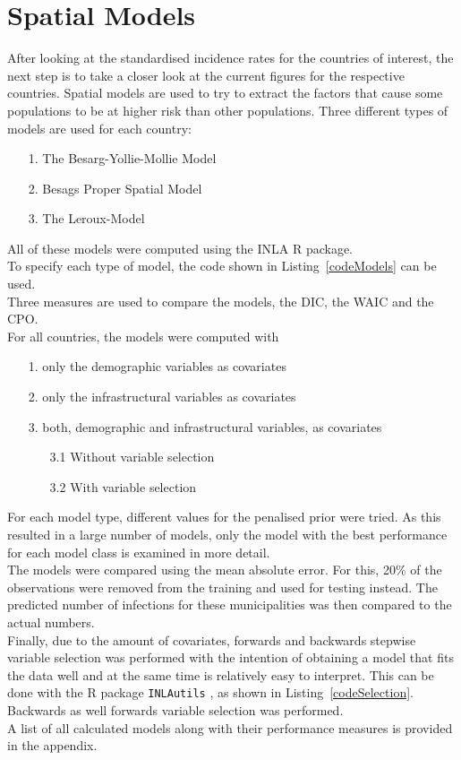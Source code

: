 \section{Spatial Models}
After looking at the standardised incidence rates for the countries of interest, the next step is to take a closer look at the current figures for the respective countries. Spatial models are used to try to extract the factors that cause some populations to be at higher risk than other populations. Three different types of models are used for each country:
\begin{itemize}
    \item[1.] The Besarg-Yollie-Mollie Model
    \item[2.] Besags Proper Spatial Model
    \item[3.] The Leroux-Model
\end{itemize}
All of these models were computed using the INLA \cite{rinla} R package. \\
To specify each type of model, the code shown in Listing~\ref{codeModels} can be used. \\
Three measures are used to compare the models, the DIC, the WAIC and the CPO. \\
For all countries, the models were computed with
\begin{itemize}
    \item[1.] only the demographic variables as covariates
    \item[2.] only the infrastructural variables as covariates
    \item[3.] both, demographic and infrastructural variables, as covariates
    \begin{itemize}
        \item[3.1] Without variable selection
        \item[3.2] With variable selection
    \end{itemize}
\end{itemize}
For each model type, different values for the penalised prior were tried. As this resulted in a large number of models, only the model with the best performance for each model class is examined in more detail. \\
The models were compared using the mean absolute error. For this, 20\% of the observations were removed from the training and used for testing instead. The predicted number of infections for these municipalities was then compared to the actual numbers.
\\
Finally, due to the amount of covariates, forwards and backwards stepwise variable selection was performed with the intention of obtaining a model that fits the data well and at the same time is relatively easy to interpret. This can be done with the R package \texttt{INLAutils} \cite{inlautils}, as shown in Listing~\ref{codeSelection}. Backwards as well forwards variable selection was performed.\\
A list of all calculated models along with their performance measures is provided in the appendix.
